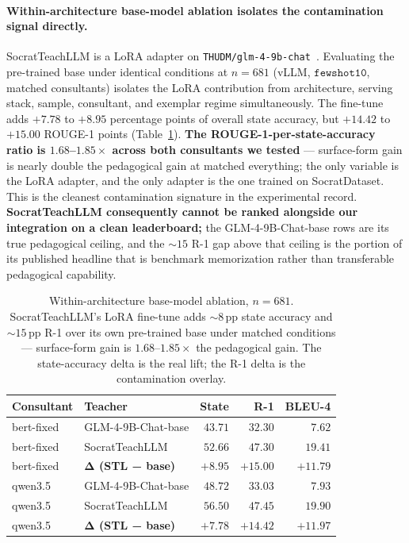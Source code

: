 \documentclass[11pt]{article}
\begin{document}
\paragraph{Within-architecture base-model ablation isolates the contamination signal directly.} SocratTeachLLM is a LoRA adapter on \texttt{THUDM/glm-4-9b-chat}~\citep{glm2024chatglm}. Evaluating the pre-trained base under identical conditions at $n{=}681$ (vLLM, $\mathtt{fewshot10}$, matched consultants) isolates the LoRA contribution from architecture, serving stack, sample, consultant, and exemplar regime simultaneously. The fine-tune adds $+7.78$ to $+8.95$ percentage points of overall state accuracy, but $+14.42$ to $+15.00$ ROUGE-1 points (Table~\ref{tab:base-ablation}). \textbf{The ROUGE-1-per-state-accuracy ratio is $1.68$--$1.85\times$ across both consultants we tested} --- surface-form gain is nearly double the pedagogical gain at matched everything; the only variable is the LoRA adapter, and the only adapter is the one trained on SocratDataset. This is the cleanest contamination signature in the experimental record. \textbf{SocratTeachLLM consequently cannot be ranked alongside our integration on a clean leaderboard;} the GLM-4-9B-Chat-base rows are its true pedagogical ceiling, and the $\sim$$15$ R-1 gap above that ceiling is the portion of its published headline that is benchmark memorization rather than transferable pedagogical capability.

\begin{table}[t]
\centering
\small
\begin{tabular}{llrrr}
\toprule
Consultant & Teacher & State & R-1 & BLEU-4 \\
\midrule
bert-fixed & GLM-4-9B-Chat-base & $43.71$ & $32.30$ & $\phantom{0}7.62$ \\
bert-fixed & SocratTeachLLM & $52.66$ & $47.30$ & $19.41$ \\
bert-fixed & \textbf{Δ (STL − base)} & $\mathbf{+8.95}$ & $\mathbf{+15.00}$ & $\mathbf{+11.79}$ \\
\midrule
qwen3.5 & GLM-4-9B-Chat-base & $48.72$ & $33.03$ & $\phantom{0}7.93$ \\
qwen3.5 & SocratTeachLLM & $56.50$ & $47.45$ & $19.90$ \\
qwen3.5 & \textbf{Δ (STL − base)} & $\mathbf{+7.78}$ & $\mathbf{+14.42}$ & $\mathbf{+11.97}$ \\
\bottomrule
\end{tabular}
\caption{Within-architecture base-model ablation, $n{=}681$. SocratTeachLLM's LoRA fine-tune adds $\sim$$8$\,pp state accuracy and $\sim$$15$\,pp R-1 over its own pre-trained base under matched conditions --- surface-form gain is $1.68$--$1.85\times$ the pedagogical gain. The state-accuracy delta is the real lift; the R-1 delta is the contamination overlay.}
\label{tab:base-ablation}
\end{table}
\end{document}
